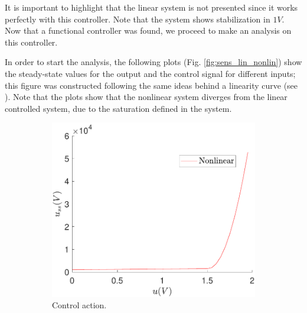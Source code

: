     It is important to highlight that the linear system is not presented since it works perfectly with this controller. Note that the system shows stabilization in $1V$. Now that a functional controller was found, we proceed to make an analysis on this controller.
    
    In order to start the analysis, the following plots (Fig. \ref{fig:sens_lin_nonlin}) show the steady-state values for the output and the control signal for different inputs; this figure was constructed following the same ideas behind a linearity curve (see \cite{JS_PL2}). Note that the plots show that the nonlinear system diverges from the linear controlled system, due to the saturation defined in the system.
    
    \begin{figure}
        \centering
        \begin{subfigure}[b]{0.475\textwidth}
            \centering
            \includegraphics[scale=0.425]{files/heuristic/Sensitivity/control_sens_lin_vs_nonlin.pdf}
            \caption{Control action.}
        \end{subfigure}
        \vskip0.1cm
        \begin{subfigure}[b]{0.475\textwidth}
            \centering 

\end{subfigure}
\end{figure}
